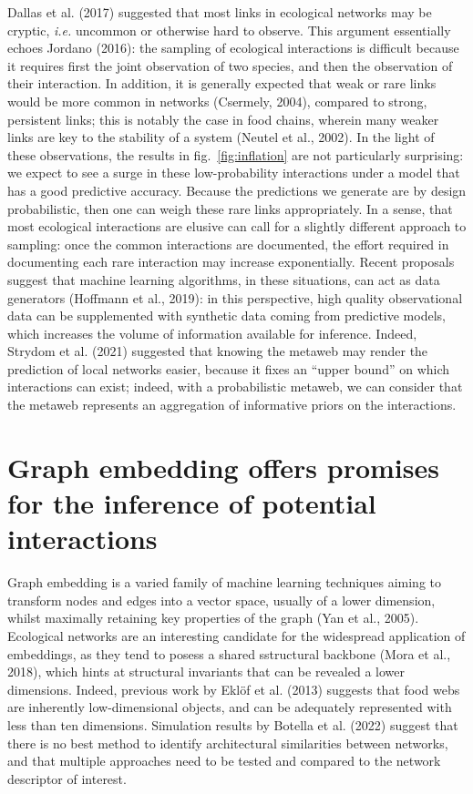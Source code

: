 \documentclass[10pt,oneside]{article}
\begin{document}
Dallas et al. (2017) suggested that most links in ecological networks
may be cryptic, \emph{i.e.} uncommon or otherwise hard to observe. This
argument essentially echoes Jordano (2016): the sampling of ecological
interactions is difficult because it requires first the joint
observation of two species, and then the observation of their
interaction. In addition, it is generally expected that weak or rare
links would be more common in networks (Csermely, 2004), compared to
strong, persistent links; this is notably the case in food chains,
wherein many weaker links are key to the stability of a system (Neutel
et al., 2002). In the light of these observations, the results in
fig.~\ref{fig:inflation} are not particularly surprising: we expect to
see a surge in these low-probability interactions under a model that has
a good predictive accuracy. Because the predictions we generate are by
design probabilistic, then one can weigh these rare links appropriately.
In a sense, that most ecological interactions are elusive can call for a
slightly different approach to sampling: once the common interactions
are documented, the effort required in documenting each rare interaction
may increase exponentially. Recent proposals suggest that machine
learning algorithms, in these situations, can act as data generators
(Hoffmann et al., 2019): in this perspective, high quality observational
data can be supplemented with synthetic data coming from predictive
models, which increases the volume of information available for
inference. Indeed, Strydom et al. (2021) suggested that knowing the
metaweb may render the prediction of local networks easier, because it
fixes an ``upper bound'' on which interactions can exist; indeed, with a
probabilistic metaweb, we can consider that the metaweb represents an
aggregation of informative priors on the interactions.

\hypertarget{graph-embedding-offers-promises-for-the-inference-of-potential-interactions}{%
\section{Graph embedding offers promises for the inference of potential
interactions}\label{graph-embedding-offers-promises-for-the-inference-of-potential-interactions}}

Graph embedding is a varied family of machine learning techniques aiming
to transform nodes and edges into a vector space, usually of a lower
dimension, whilst maximally retaining key properties of the graph (Yan
et al., 2005). Ecological networks are an interesting candidate for the
widespread application of embeddings, as they tend to posess a shared
sstructural backbone (Mora et al., 2018), which hints at structural
invariants that can be revealed a lower dimensions. Indeed, previous
work by Eklöf et al. (2013) suggests that food webs are inherently
low-dimensional objects, and can be adequately represented with less
than ten dimensions. Simulation results by Botella et al. (2022) suggest
that there is no best method to identify architectural similarities
between networks, and that multiple approaches need to be tested and
compared to the network descriptor of interest.
\end{document}

